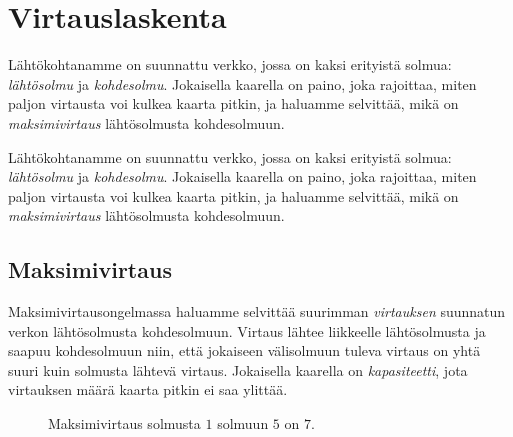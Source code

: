 \chapter{Virtauslaskenta}

Lähtökohtanamme on suunnattu verkko, jossa on kaksi erityistä solmua:
\emph{lähtösolmu} ja \emph{kohdesolmu}.
Jokaisella kaarella on paino, joka rajoittaa,
miten paljon virtausta voi kulkea kaarta pitkin,
ja haluamme selvittää, mikä on \emph{maksimivirtaus} lähtösolmusta
kohdesolmuun.

Lähtökohtanamme on suunnattu verkko, jossa on kaksi erityistä solmua:
\emph{lähtösolmu} ja \emph{kohdesolmu}.
Jokaisella kaarella on paino, joka rajoittaa,
miten paljon virtausta voi kulkea kaarta pitkin,
ja haluamme selvittää, mikä on \emph{maksimivirtaus} lähtösolmusta
kohdesolmuun.

\section{Maksimivirtaus}

Maksimivirtausongelmassa haluamme selvittää
suurimman \emph{virtauksen} suunnatun verkon
lähtösolmusta kohdesolmuun.
Virtaus lähtee liikkeelle lähtö\-solmusta ja saapuu kohdesolmuun
niin, että jokaiseen välisolmuun tuleva virtaus on
yhtä suuri kuin solmusta lähtevä virtaus.
Jokaisella kaarella on \emph{kapasiteetti}, jota virtauksen
määrä kaarta pitkin ei saa ylittää.

\begin{figure}
\center
\begin{center}
\end{center}
\caption{Maksimivirtaus solmusta $1$ solmuun $5$ on $7$.}
\label{fig:makvir}
\end{figure}

